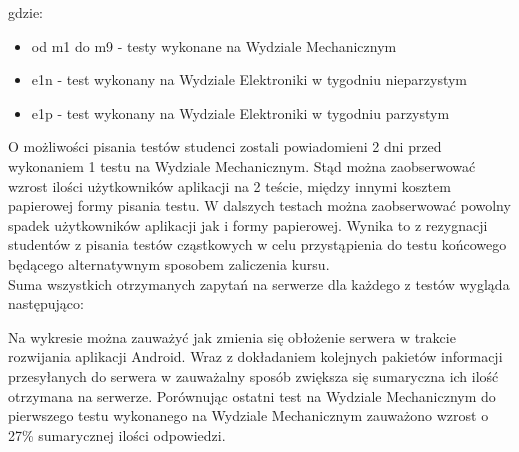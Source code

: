 \documentclass[eng]{mgr}
\begin{document}
		gdzie:
		\begin{itemize}
			\item od m1 do m9 - testy wykonane na Wydziale Mechanicznym
			\item e1n - test wykonany na Wydziale Elektroniki w tygodniu nieparzystym
			\item e1p - test wykonany na Wydziale Elektroniki w tygodniu parzystym
		\end{itemize}
	
		O możliwości pisania testów studenci zostali powiadomieni 2 dni przed wykonaniem 1 testu na Wydziale Mechanicznym. Stąd można zaobserwować wzrost ilości użytkowników aplikacji na 2 teście, między innymi kosztem papierowej formy pisania testu. W dalszych testach można zaobserwować powolny spadek użytkowników aplikacji jak i formy papierowej. Wynika to z rezygnacji studentów z pisania testów cząstkowych w celu przystąpienia do testu końcowego będącego alternatywnym sposobem zaliczenia kursu.\\
	
		Suma wszystkich otrzymanych zapytań na serwerze dla każdego z testów wygląda następująco:
		
		\begin{center}
		\end{center}
		
		Na wykresie można zauważyć jak zmienia się obłożenie serwera w trakcie rozwijania aplikacji Android. Wraz z dokładaniem kolejnych pakietów informacji przesyłanych do serwera w zauważalny sposób zwiększa się sumaryczna ich ilość otrzymana na serwerze. Porównując ostatni test na Wydziale Mechanicznym do pierwszego testu wykonanego na Wydziale Mechanicznym zauważono wzrost o 27\% sumarycznej ilości odpowiedzi.\\
		
\end{document}

